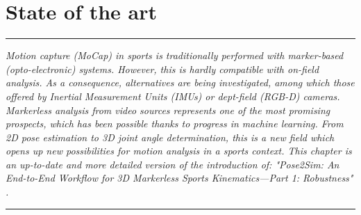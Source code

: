 
\lhead[\fancyplain{}{\leftmark}]%
      {\fancyplain{}{}} %
\chead[\fancyplain{}{}]%
      {\fancyplain{}{}}
\rhead[\fancyplain{}{}]%
      {\fancyplain{}{\rightmark}}%
\lfoot[\fancyplain{}{}]%
      {\fancyplain{}{}}
\cfoot[\fancyplain{}{\thepage}]%
      {\fancyplain{}{\thepage}} %
\rfoot[\fancyplain{}{}]%
     {\fancyplain{}{\scriptsize}}



\chapter{State of the art}
\label{ch:1}


\begin{center}
\rule{0.7\linewidth}{.5pt}
\begin{minipage}{0.7\linewidth}
\smallskip

\textit{Motion capture (MoCap) in sports is traditionally performed with marker-based (opto-electronic) systems. However, this is hardly compatible with on-field analysis. As a consequence, alternatives are being investigated, among which those offered by Inertial Measurement Units (IMUs) or dept-field (RGB-D) cameras. Markerless analysis from video sources represents one of the most promising prospects, which has been possible thanks to progress in machine learning. From 2D pose estimation to 3D joint angle determination, this is a new field which opens up new possibilities for motion analysis in a sports context.\newline \newline
This chapter is an up-to-date and more detailed version of the introduction of: "Pose2Sim: An End-to-End Workflow for 3D Markerless Sports Kinematics—Part 1: Robustness" \cite{Pagnon2021}. }

\end{minipage}
\smallskip
\rule{0.7\linewidth}{.5pt}
\end{center}


